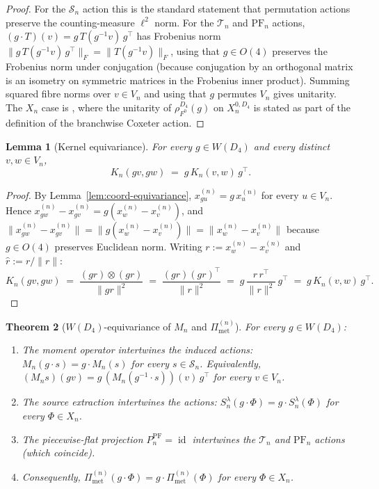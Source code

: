 \documentclass[11pt, a4paper]{amsart}
\newtheorem{theorem}{Theorem}[section]
\newtheorem{lemma}[theorem]{Lemma}
\theoremstyle{definition}
\newcommand{\id}{\operatorname{id}}
\newcommand{\Met}{\mathrm{met}}
\newcommand{\PF}{\mathrm{PF}}
\newcommand{\Pimet}{\Pi_{\Met}}
\begin{document}
\begin{proof}
For the $\mathcal S_n$ action this is the standard statement that
permutation actions preserve the counting-measure $\ell^2$ norm.
For the $\mathcal T_n$ and $\PF_n$ actions, $(g \cdot T)(v) =
g\,T(g^{-1}v)\,g^\top$ has Frobenius norm $\|g\,T(g^{-1}v)\,
g^\top\|_F = \|T(g^{-1}v)\|_F$, using that $g \in O(4)$ preserves
the Frobenius norm under conjugation (because conjugation by an
orthogonal matrix is an isometry on symmetric matrices in the
Frobenius inner product). Summing squared fibre norms over
$v \in V_n$ and using that $g$ permutes $V_n$ gives unitarity.
The $X_n$ case is \cite[Def.~8.1]{RefinementSpaces}, where the
unitarity of $\rho_{F^0}^{D_4}(g)$ on $X_n^{0, D_4}$ is stated as
part of the definition of the branchwise Coxeter action.
\end{proof}

\begin{lemma}[Kernel equivariance]
\label{lem:kernel-equiv}
For every $g \in W(D_4)$ and every distinct $v, w \in V_n$,
\[
  K_n(g v, g w) \;=\; g\,K_n(v, w)\,g^\top.
\]
\end{lemma}

\begin{proof}
By Lemma~\ref{lem:coord-equivariance}, $x_{g u}^{(n)} = g\,x_u^{(n)}$ for
every $u \in V_n$. Hence
$x_{g w}^{(n)} - x_{g v}^{(n)} = g(x_w^{(n)} - x_v^{(n)})$, and
$\|x_{g w}^{(n)} - x_{g v}^{(n)}\| = \|g(x_w^{(n)} - x_v^{(n)})\|
= \|x_w^{(n)} - x_v^{(n)}\|$ because $g \in O(4)$ preserves
Euclidean norm. Writing $r := x_w^{(n)} - x_v^{(n)}$ and
$\hat r := r/\|r\|$:
\[
  K_n(gv, gw)
    \;=\; \frac{(gr) \otimes (gr)}{\|gr\|^2}
    \;=\; \frac{(gr)(gr)^\top}{\|r\|^2}
    \;=\; g\,\frac{r\,r^\top}{\|r\|^2}\,g^\top
    \;=\; g\,K_n(v, w)\,g^\top.
\]
\end{proof}

\begin{theorem}[$W(D_4)$-equivariance of $M_n$ and $\Pimet^{(n)}$]
\label{thm:mn-equivariance}
For every $g \in W(D_4)$:
\begin{enumerate}
\item[\textup{(i)}] The moment operator intertwines the induced
  actions: $M_n(g \cdot s) = g \cdot M_n(s)$ for every $s \in
  \mathcal S_n$. Equivalently,
  $(M_n s)(gv) = g\,(M_n(g^{-1}\cdot s))(v)\,g^\top$ for every
  $v \in V_n$.
\item[\textup{(ii)}] The source extraction intertwines the
  actions: $S_n^\lambda(g \cdot \Phi) = g \cdot S_n^\lambda(\Phi)$ for every
  $\Phi \in X_n$.
\item[\textup{(iii)}] The piecewise-flat projection
  $P_n^\PF = \id$ intertwines the $\mathcal T_n$ and $\PF_n$
  actions (which coincide).
\item[\textup{(iv)}] Consequently, $\Pimet^{(n)}(g \cdot \Phi) =
  g \cdot \Pimet^{(n)}(\Phi)$ for every $\Phi \in X_n$.
\end{enumerate}
\end{theorem}
\end{document}
